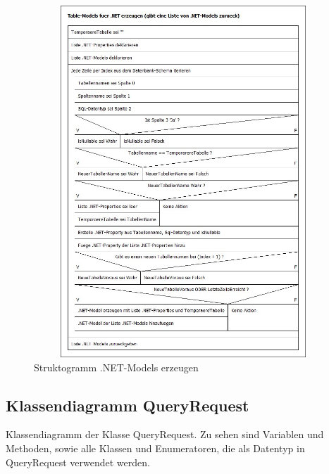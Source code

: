 \documentclass[11pt,toc=sectionentrywithoutdots, 
headheight=44pt, headings=optiontoheadandtoc, hyperfootnotes=false, hypertexnames=false]{scrartcl}
\begin{document}
 \begin{figure}[htp]
 \centering

	\includegraphics[height=500, width=430]{struktogramm.png}
	 \caption{Struktogramm .NET-Models erzeugen}
 \end{figure}
 \clearpage
 
\subsection{Klassendiagramm QueryRequest}
Klassendiagramm der Klasse QueryRequest. Zu sehen sind Variablen und Methoden, sowie alle Klassen und Enumeratoren, die als Datentyp in QueryRequest verwendet werden.
 \label{fig:Klassendiagramm}
\end{document}
